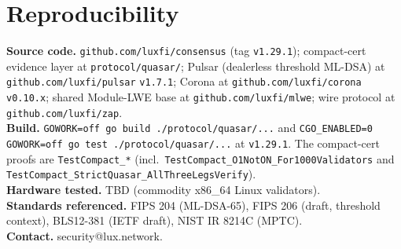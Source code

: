 \documentclass[11pt,a4paper]{article}
\begin{document}
\tableofcontents
\newpage


















\appendix
\section*{Reproducibility}
\textbf{Source code.} \texttt{github.com/luxfi/consensus} (tag \texttt{v1.29.1}); compact-cert evidence layer at \texttt{protocol/quasar/}; Pulsar (dealerless threshold ML-DSA) at \texttt{github.com/luxfi/pulsar} \texttt{v1.7.1}; Corona at \texttt{github.com/luxfi/corona} \texttt{v0.10.x}; shared Module-LWE base at \texttt{github.com/luxfi/mlwe}; wire protocol at \texttt{github.com/luxfi/zap}.\\
\textbf{Build.} \texttt{GOWORK=off go build ./protocol/quasar/...} and \texttt{CGO\_ENABLED=0 GOWORK=off go test ./protocol/quasar/...} at \texttt{v1.29.1}. The compact-cert proofs are \texttt{TestCompact\_*} (incl.\ \texttt{TestCompact\_O1NotON\_For1000Validators} and \texttt{TestCompact\_StrictQuasar\_AllThreeLegsVerify}).\\
\textbf{Hardware tested.} TBD (commodity x86\_64 Linux validators).\\
\textbf{Standards referenced.} FIPS 204 (ML-DSA-65), FIPS 206 (draft, threshold context), BLS12-381 (IETF draft), NIST IR 8214C (MPTC).\\
\textbf{Contact.} security@lux.network.
\end{document}
